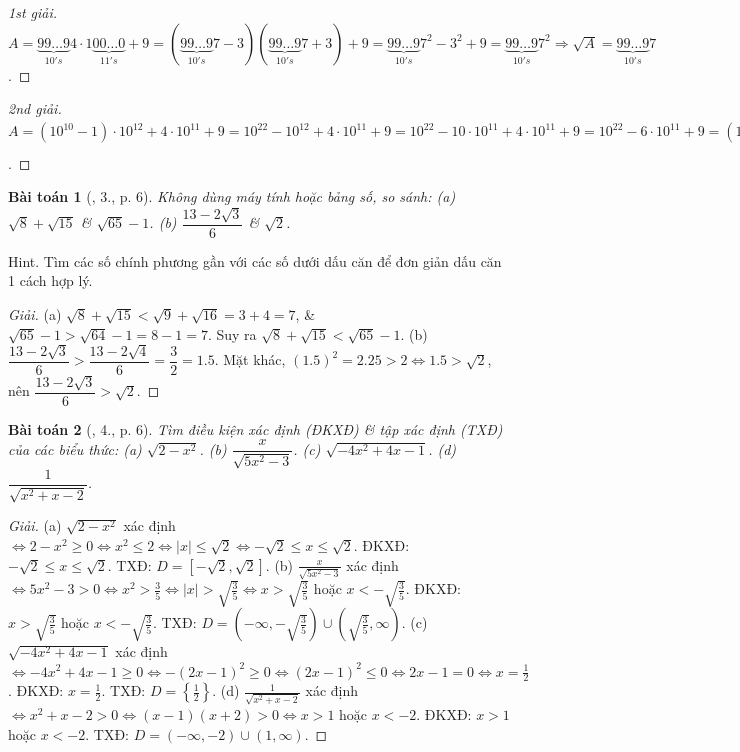 \documentclass{article}
\newtheorem{baitoan}{Bài toán}
\begin{document}
\begin{proof}[1st giải]
	$A = \underbrace{99\ldots9}_{10's}4\cdot1\underbrace{00\ldots0}_{11's} + 9 = (\underbrace{99\ldots9}_{10's}7 - 3)(\underbrace{99\ldots9}_{10's}7 + 3) + 9 = \underbrace{99\ldots9}_{10's}7^2 - 3^2 + 9 = \underbrace{99\ldots9}_{10's}7^2\Rightarrow\sqrt{A} = \underbrace{99\ldots9}_{10's}7$.
\end{proof}

\begin{proof}[2nd giải]
	$A = (10^{10} - 1)\cdot10^{12} + 4\cdot10^{11} + 9 = 10^{22} - 10^{12} + 4\cdot10^{11} + 9 = 10^{22} - 10\cdot10^{11} + 4\cdot10^{11} + 9 = 10^{22} - 6\cdot10^{11} + 9 = (10^{11} - 3)^2\Rightarrow\sqrt{A} = 10^{11} - 3 = \underbrace{99\ldots9}_{10's}7$.
\end{proof}

\begin{baitoan}[\cite{Tuyen_Toan_9}, 3., p. 6]
	Không dùng máy tính hoặc bảng số, so sánh: (a) $\sqrt{8} + \sqrt{15}$ \& $\sqrt{65} - 1$. (b) $\dfrac{13 - 2\sqrt{3}}{6}$ \& $\sqrt{2}$.
\end{baitoan}
\noindent\textsf{Hint.} Tìm các số chính phương gần với các số dưới dấu căn để đơn giản dấu căn 1 cách hợp lý. 

\begin{proof}[Giải]
	(a) $\sqrt{8} + \sqrt{15} < \sqrt{9} + \sqrt{16} = 3 + 4 = 7$, \& $\sqrt{65} - 1 > \sqrt{64} - 1 = 8 - 1 = 7$. Suy ra $\sqrt{8} + \sqrt{15} < \sqrt{65} - 1$. (b) $\dfrac{13 - 2\sqrt{3}}{6} > \dfrac{13 - 2\sqrt{4}}{6} = \dfrac{3}{2} = 1.5$. Mặt khác, $(1.5)^2 = 2.25 > 2\Leftrightarrow 1.5 > \sqrt{2}$, nên $\dfrac{13 - 2\sqrt{3}}{6} > \sqrt{2}$.
\end{proof}

\begin{baitoan}[\cite{Tuyen_Toan_9}, 4., p. 6]
	Tìm điều kiện xác định (ĐKXĐ) \& tập xác định (TXĐ) của các biểu thức: (a) $\sqrt{2 - x^2}$. (b) $\dfrac{x}{\sqrt{5x^2 - 3}}$. (c) $\sqrt{-4x^2 + 4x - 1}$. (d) $\dfrac{1}{\sqrt{x^2 + x - 2}}$.
\end{baitoan}

\begin{proof}[Giải]
	(a) $\sqrt{2 - x^2}$ xác định $\Leftrightarrow2 - x^2\ge0\Leftrightarrow x^2\le2\Leftrightarrow|x|\le\sqrt{2}\Leftrightarrow-\sqrt{2}\le x\le\sqrt{2}$. ĐKXĐ: $-\sqrt{2}\le x\le\sqrt{2}$. TXĐ: $D = [-\sqrt{2},\sqrt{2}]$. (b) $\frac{x}{\sqrt{5x^2 - 3}}$ xác định $\Leftrightarrow 5x^2 - 3 > 0\Leftrightarrow x^2 > \frac{3}{5}\Leftrightarrow|x| > \sqrt{\frac{3}{5}}\Leftrightarrow x > \sqrt{\frac{3}{5}}$ hoặc $x < -\sqrt{\frac{3}{5}}$. ĐKXĐ: $x > \sqrt{\frac{3}{5}}$ hoặc $x < -\sqrt{\frac{3}{5}}$. TXĐ: $D = \left(-\infty,-\sqrt{\frac{3}{5}}\right)\cup\left(\sqrt{\frac{3}{5}},\infty\right)$. (c) $\sqrt{-4x^2 + 4x - 1}$ xác định $\Leftrightarrow-4x^2 + 4x - 1\ge0\Leftrightarrow-(2x - 1)^2\ge0\Leftrightarrow(2x - 1)^2\le0\Leftrightarrow2x - 1 = 0\Leftrightarrow x = \frac{1}{2}$. ĐKXĐ: $x = \frac{1}{2}$. TXĐ: $D = \left\{\frac{1}{2}\right\}$. (d) $\frac{1}{\sqrt{x^2 + x - 2}}$ xác định $\Leftrightarrow x^2 + x - 2 > 0\Leftrightarrow(x - 1)(x + 2) > 0\Leftrightarrow x > 1$ hoặc $x < -2$. ĐKXĐ: $x > 1$ hoặc $x < -2$. TXĐ: $D = (-\infty,-2)\cup(1,\infty)$.
\end{proof}
\end{document}
